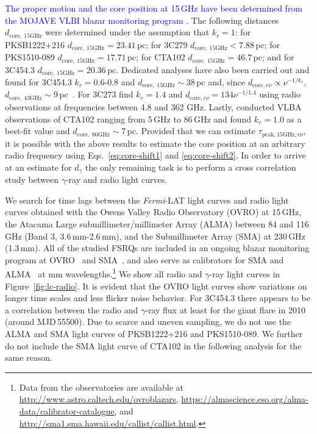 \documentclass[twocolumn,linenumbers]{aastex62}
\newcommand{\gray}{$\gamma$-ray\xspace}
\newcommand{\fermiLAT}{\emph{Fermi}-LAT\xspace}
\newcommand{\response}[1]{\textcolor{blue}{#1}}
\begin{document}
\response{
The proper motion and the core position at 15\,GHz have been determined from
the MOJAVE VLBI blazar monitoring program  \citep[][]{2012A&A...545A.113P,2016AJ....152...12L}.
}
The following distances $d_\mathrm{core,~15GHz}$ were determined  under the assumption that $k_r = 1$: for PKSB1222+216 $d_\mathrm{core,~15GHz}= 23.41\,$pc; for 3C279 $d_\mathrm{core,~15GHz}<7.88$\,pc; for PKS1510-089 $d_\mathrm{core,~15GHz} = 17.71\,$pc; for 
CTA102 $d_\mathrm{core,~15GHz} =46.7\,$pc; and for 3C454.3 $d_\mathrm{core,~15GHz} = 20.36\,$pc.
Dedicated analyses have also been carried out and found for 3C454.3 $k_r = 0.6$-$0.8$ and $d_\mathrm{core,~15GHz} \sim 38\,$pc and, since $d_{\mathrm{core},r\nu}\propto\nu^{-1/k_r}$,  $d_\mathrm{core,~43GHz} \sim 9\,$pc~\citep{2014MNRAS.437.3396K}. 
For 3C273 \citet{2013ARep...57...34V} find $k_r = 1.4$ and $d_{\mathrm{core},r\nu} = 134\nu^{-1/1.4}$ using radio observations at frequencies between 4.8 and 362 GHz.
Lastly, \citet{2015A&A...576A..43F} conducted VLBA observations of CTA102 ranging from 5\,GHz to 86\,GHz and found $k_r = 1.0$ as a best-fit value and $d_{\mathrm{core,~86GHz}}\sim7\,$pc.
Provided that we can estimate $\tau_{\mathrm{peak,15GHz},r\nu}$, it is possible with the above results to estimate the core position at an arbitrary radio frequency using Eqs.~\ref{eq:core-shift1} and \ref{eq:core-shift2}.
In order to arrive at an estimate for $d_\gamma$ the only remaining task is to perform a cross correlation study between \gray and radio light curves.

We search for time lags between the \fermiLAT light curves and radio light curves obtained with the Owens Valley Radio Observatory (OVRO) at 15\,GHz, the Atacama Large submillimeter/millimeter Array (ALMA) between 84 and 116\,GHz (Band 3, 3.6\,mm-2.6\,mm), and the Submillimeter Array (SMA) at 230\,GHz (1.3\,mm). 
All of the studied FSRQs are included in an ongoing blazar monitoring program at OVRO~\citep{2011ApJS..194...29R} and SMA~\citep{2007ASPC..375..234G}, and also serve as calibrators for SMA and ALMA~\citep{2018MNRAS.478.1512B} at mm wavelengths.\footnote{Data from the observatories are available at \url{http://www.astro.caltech.edu/ovroblazars}, \url{https://almascience.eso.org/alma-data/calibrator-catalogue}, and \url{http://sma1.sma.hawaii.edu/callist/callist.html}.}
We show all radio and \gray light curves in Figure~\ref{fig:lc-radio}.
It is evident that the OVRO light curves show variations on longer time scales and less flicker noise behavior. 
For 3C454.3 there appears to be a correlation between the radio and \gray flux at least for the giant flare in 2010 (around MJD\,55500). 
Due to scarce and uneven sampling, we do not use the ALMA and SMA light curves of PKSB1222+216 and PKS1510-089.
We further do not include the SMA light curve of CTA102 in the following analysis for the same reason.
\end{document}
